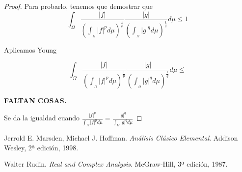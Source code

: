 \documentclass[11pt, a4paper]{article}
\theoremstyle{theorem-style}
\theoremstyle{definition-style}
\theoremstyle{remark-style}
\theoremstyle{example-style}
\begin{document}
\begin{proof}
	Para probarlo, tenemos que demostrar que $$ \int_{\Omega} \frac{|f|}{\left( \int_{_\Omega} |f|^p d \mu \right)^{\frac{1}{p}}} \frac{|g|}{\left( \int_{_\Omega} |g|^q d \mu \right)^{\frac{1}{q}}} d \mu \leq 1$$
	
	Aplicamos Young
	
	$$\int_{\Omega} \frac{|f|}{\left( \int_{_\Omega} |f|^p d \mu \right)^{\frac{1}{p}}} \frac{|g|}{\left( \int_{_\Omega} |g|^q d \mu \right)^{\frac{1}{q}}} d \mu \leq $$
	
	\textbf{FALTAN COSAS.}
	
	Se da la igualdad cuando $\displaystyle \frac{|f|^p}{\int_{\Omega} |f|^p d \mu } = \frac{|g|^q}{\int_{\Omega} |g|^q d \mu }$
\end{proof}
\newpage

\begin{thebibliography}{9}

  Jerrold E. Marsden, Michael  J. Hoffman.
  \emph{Análisis Clásico Elemental}.
  Addison Wesley,
  2ª edición,
  1998.

  Walter Rudin.
  \emph{Real and Complex Analysis}.
  McGraw-Hill,
  3ª edición,
  1987.

\end{thebibliography}

	
	
\end{document}
